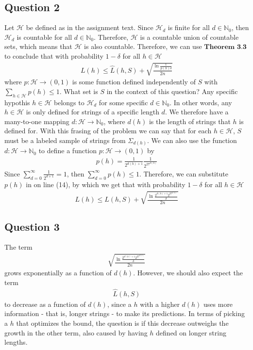 \subsection{Question 2}
Let $\mathcal{H}$ be defined as in the assignment text. Since $\mathcal{H}_d$ is finite for all $d\in \mathbb{N}_0$, then $\mathcal{H}_d$ is countable for all $d\in \mathbb{N}_0$. Therefore, $\mathcal{H}$ is a countable union of countable sets, which means that $\mathcal{H}$ is also countable. Therefore, we can use $\textbf{Theorem 3.3}$ to conclude that with probability $1 - \delta$ for all $h \in \mathcal{H}$
\begin{align}
L(h) \leq \hat{L}(h,S) + \sqrt{\frac{\ln \frac{1}{p(h)\delta}}{2n}}
\end{align}
where $p: \mathcal{H} \to (0,1)$ is some function defined independently of $S$ with $\sum_{h \in \mathcal{H}}p(h) \leq 1$. What set is $S$ in the context of this question? Any specific hypothis $h\in \mathcal{H}$ belongs to $\mathcal{H}_d$ for some specific $d\in \mathbb{N}_0$. In other words, any $h\in \mathcal{H}$ is only defined for strings of a specific length $d$. We therefore have a many-to-one mapping $d: \mathcal{H} \to \mathbb{N}_0$, where $d(h)$ is the length of strings that $h$ is defined for. With this frasing of the problem we can say that for each $h\in \mathcal{H}$, $S$ must be a labeled sample of strings from $\Sigma_{d(h)}$. We can also use the function $d: \mathcal{H} \to \mathbb{N}_0$ to define a function $p: \mathcal{H} \to (0,1)$ by
\begin{align}
p(h)=\frac{1}{2^{d(h) + 1}}\frac{1}{2^{27^{d(h)}}}
\end{align}
Since $\sum_{d=0}^\infty \frac{1}{2^{d+1}}=1$, then $\sum_{d=0}^\infty p(h) \leq 1$. Therefore, we can substitute $p(h)$ in on line (14), by which we get that with probability $1 - \delta$ for all $h \in \mathcal{H}$
\begin{align}
L(h) \leq \hat{L}(h,S) + \sqrt{\frac{\ln \frac{2^{d(h) + 1} 2^{27^{d(h)}}}{\delta}}{2n}}
\end{align}


\subsection{Question 3}
The term 
\begin{align}
\sqrt{\frac{\ln \frac{2^{d(h) + 1} 2^{27^{d(h)}}}{\delta}}{2n}}
\end{align}
grows exponentially as a function of $d(h)$. However, we should also expect the term 
\begin{align}
\hat{L}(h,S) 
\end{align}
to decrease as a function of $d(h)$, since a $h$ with a higher $d(h)$ uses more information - that is, longer strings - to make its predictions. In terms of picking a $h$ that optimizes the bound, the question is if this decrease outweighs the growth in the other term, also caused by having $h$ defined on longer string lengths.